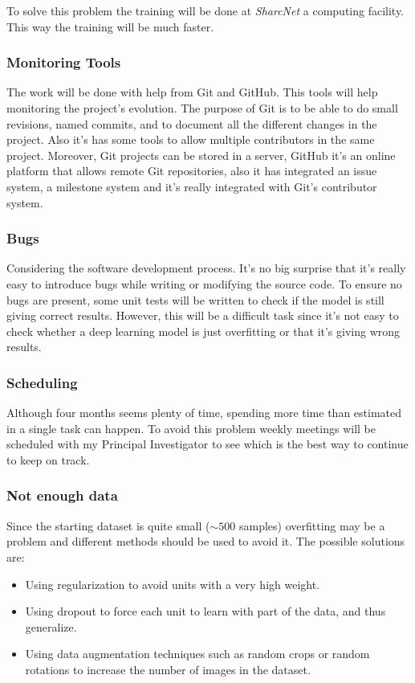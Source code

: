 To solve this problem the training will be done at \emph{SharcNet} a computing facility. 
This way the training will be much faster.

\subsubsection{Monitoring Tools}

The work will be done with help from Git and GitHub. This tools will help monitoring
the project's evolution. The purpose of Git is to be able to do small revisions,
named commits, and to document all the different changes in the project. Also it's has
some tools to allow multiple contributors in the same project. Moreover,
Git projects can be stored in a server, GitHub it's an online platform that allows
remote Git repositories, also it has integrated an issue system, a milestone system
and it's really integrated with Git's contributor system.
~\cites{tool:git}{tool:github}

\subsubsection{Bugs}

Considering the software development process. It's no big surprise that it's really easy to
introduce bugs while writing or modifying the source code. To ensure no bugs are present,
some unit tests will be written to check if the model is still giving correct results.
However, this will be a difficult task since it's not easy to check whether a deep 
learning model is just overfitting or that it's giving wrong results.

\subsubsection{Scheduling}

Although four months seems plenty of time, spending more time than estimated in a single task
can happen. To avoid this problem weekly meetings will be scheduled with my Principal Investigator
to see which is the best way to continue to keep on track.

\subsubsection{Not enough data}

Since the starting dataset is quite small (\( \sim 500 \) samples) overfitting may be a problem
and different methods should be used to avoid it. The possible solutions are:
\begin{itemize}
  \item Using regularization to avoid units with a very high weight.
  \item Using dropout to force each unit to learn with part of the data, and thus generalize.
  \item Using data augmentation techniques such as random crops or random rotations to increase
  the number of images in the dataset.
\end{itemize}
